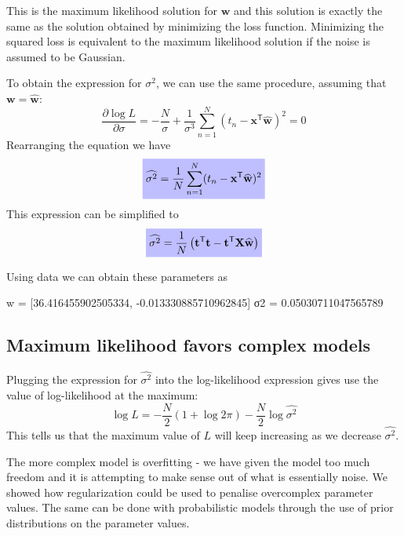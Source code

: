 This is the maximum likelihood solution for $\mathbf{w}$ and this solution is exactly
the same as the solution obtained by minimizing the loss function.
Minimizing the squared loss is equivalent
to the maximum likelihood solution if the noise is assumed to be Gaussian.

To obtain the expression for $\sigma^2$, we can use the same procedure,
assuming that $\mathbf{w} = \widehat{\mathbf{w}}$:
\begin{equation}
\frac{\partial \log L}{\partial \sigma} = -\frac{N}{\sigma} +
\frac{1}{\sigma^3}\sum_{n=1}^{N} (t_{n} - \mathbf{x}^{\mathsf{T}}\widehat{\mathbf{w}})^2 = 0
\end{equation}
Rearranging the equation we have
\begin{equation}
\highlighteq{
\widehat{\sigma^2} = \frac{1}{N}\sum_{n=1}^{N} (t_n - \mathbf{x}^{\mathsf{T}}\widehat{\mathbf{w}})^2
}
\end{equation}
This expression can be simplified to
\begin{equation}
\highlighteq{
\widehat{\sigma^2} = \frac{1}{N}\left(
\mathbf{t}^{\mathsf{T}}\mathbf{t} - \mathbf{t}^{\mathsf{T}}\mathbf{X}\widehat{\mathbf{w}}
\right)
}
\end{equation}

Using  data we can obtain these parameters as
\begin{textcode}
w = [36.416455902505334, -0.013330885710962845]
σ2 = 0.05030711047565789
\end{textcode}

\subsection{Maximum likelihood favors complex models}

Plugging the expression for $\widehat{\sigma^2}$ into the log-likelihood
expression gives use the value of log-likelihood at the maximum:
\begin{equation}
\log L = -\frac{N}{2}(1 + \log 2\pi) - \frac{N}{2}\log\widehat{\sigma^2}
\end{equation}
This tells us that the maximum value of $L$ will keep increasing as
we decrease $\widehat{\sigma^2}$.

The more complex model is overfitting - we have given the model too
much freedom and it is attempting to make sense out of what is essentially noise.
We showed how regularization could be used to penalise overcomplex
parameter values. The same can be done with probabilistic models through the use
of prior distributions on the parameter values.

